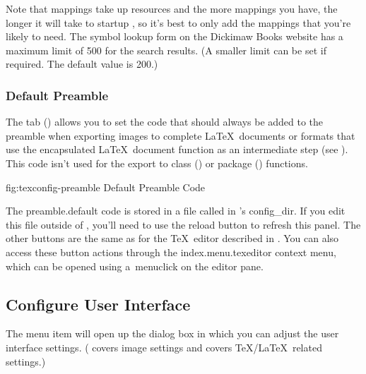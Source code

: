 \begin{warning}
Note that mappings take up resources and the more mappings you have,
the longer it will take to startup \FlowframTk, so it's best to only
add the mappings that you're likely to need. The symbol lookup form
on the Dickimaw Books website has a maximum limit of 500 for the search
results. (A smaller limit can be set if required. The default value
is 200.)
\end{warning}

\subsubsection{Default Preamble}\label{sec:texconfigpreamble}


The  tab
() allows you to set the
 code that
should always be added to the preamble when exporting images to
complete \LaTeX\ documents or formats that use the encapsulated
\LaTeX\ document function as an intermediate step (see
). This code isn't used for the export to
class () or package () functions.

\FloatFig
  {fig:texconfig-preamble}
  {}
  {Default Preamble Code}

The \gls{preamble.default} code is stored in a file called
 in \FlowframTk's \gls{config_dir}. If you edit
this file outside of \FlowframTk, you'll need to use the reload
button to refresh this panel. The other buttons are the same as for
the \TeX\ editor described in .  You can
also access these button actions through the
\gls{index.menu.texeditor} context menu, which can be opened using
a~\gls{menuclick} on the editor pane.


\subsection{Configure User Interface}\label{sec:configureuidialog}


The menu item  will open up 
the  dialog box
in which you can adjust the user interface settings.
( covers image settings
and  covers \TeX\slash\LaTeX\ related
settings.)


